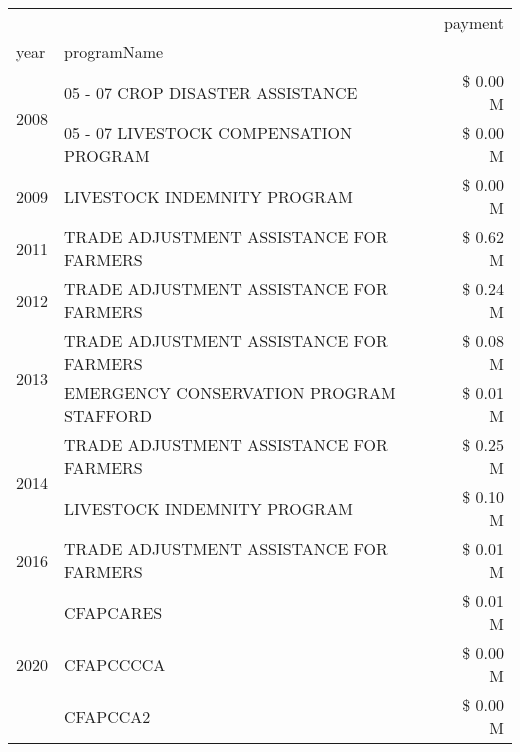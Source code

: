 \begin{tabular}{llr}
\toprule
 &  & payment \\
year & programName &  \\
\midrule
\multirow[t]{2}{*}{2008} & 05 - 07 CROP DISASTER ASSISTANCE & \$ 0.00 M \\
 & 05 - 07 LIVESTOCK COMPENSATION PROGRAM & \$ 0.00 M \\
\cline{1-3}
2009 & LIVESTOCK INDEMNITY PROGRAM & \$ 0.00 M \\
\cline{1-3}
2011 & TRADE ADJUSTMENT ASSISTANCE FOR FARMERS & \$ 0.62 M \\
\cline{1-3}
2012 & TRADE ADJUSTMENT ASSISTANCE FOR FARMERS & \$ 0.24 M \\
\cline{1-3}
\multirow[t]{2}{*}{2013} & TRADE ADJUSTMENT ASSISTANCE FOR FARMERS & \$ 0.08 M \\
 & EMERGENCY CONSERVATION PROGRAM STAFFORD & \$ 0.01 M \\
\cline{1-3}
\multirow[t]{2}{*}{2014} & TRADE ADJUSTMENT ASSISTANCE FOR FARMERS & \$ 0.25 M \\
 & LIVESTOCK INDEMNITY PROGRAM & \$ 0.10 M \\
\cline{1-3}
2016 & TRADE ADJUSTMENT ASSISTANCE FOR FARMERS & \$ 0.01 M \\
\cline{1-3}
\multirow[t]{3}{*}{2020} & CFAPCARES & \$ 0.01 M \\
 & CFAPCCCCA & \$ 0.00 M \\
 & CFAPCCA2 & \$ 0.00 M \\
\cline{1-3}
\bottomrule
\end{tabular}
